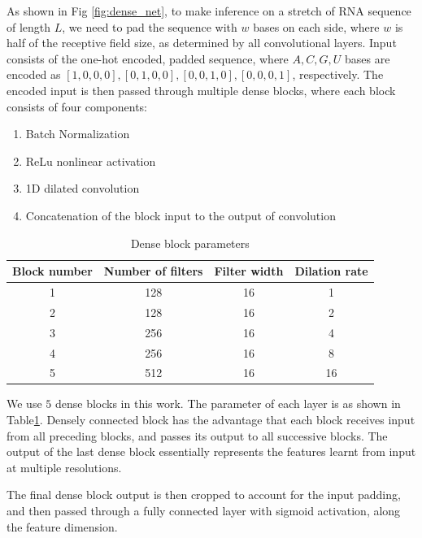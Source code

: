 \documentclass{proposal}
\begin{document}
As shown in Fig \ref{fig:dense_net}, to make inference on a stretch of RNA sequence of length $L$,
we need to pad the sequence with $w$ bases on each side, where $w$ is half of the receptive field size,
as determined by all convolutional layers.
Input consists of the one-hot encoded, padded sequence,
where $A, C, G, U$ bases are encoded as $[1, 0, 0, 0], [0, 1, 0, 0], [0, 0, 1, 0], [0, 0, 0, 1]$, respectively.
The encoded input is then passed through multiple dense blocks,
where each block consists of four components:

\begin{enumerate}
    \item Batch Normalization
    \item ReLu nonlinear activation
    \item 1D dilated convolution
    \item Concatenation of the block input to the output of convolution
\end{enumerate}


\begin{table}[h!]
    \centering
    \begin{tabular}{||c c c c||}
        \hline
        Block number & Number of filters & Filter width & Dilation rate \\ [0.5ex]
        \hline\hline
        1 & 128 & 16 & 1 \\
        \hline
        2 & 128 & 16 & 2 \\
        \hline
        3 & 256 & 16 & 4 \\
        \hline
        4 & 256 & 16 & 8 \\
        \hline
        5 & 512 & 16 & 16 \\ [1ex]
        \hline
    \end{tabular}
    \caption{Dense block parameters}
    \label{table:conv_layer_params}
\end{table}

We use $5$ dense blocks in this work. The parameter of each layer is as shown in Table\ref{table:conv_layer_params}.
Densely connected block has the advantage that each block receives input from all preceding blocks,
and passes its output to all successive blocks.
The output of the last dense block essentially represents the features learnt from input at multiple resolutions.

The final dense block output is then cropped to account for the input padding,
and then passed through a fully connected layer with sigmoid activation, along the feature dimension.
\end{document}
